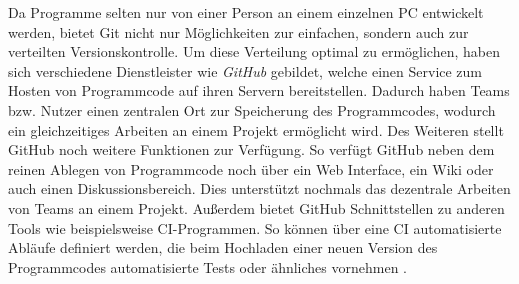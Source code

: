 Da Programme selten nur von einer Person an einem einzelnen PC entwickelt
werden, bietet Git nicht nur Möglichkeiten zur einfachen, sondern auch zur
verteilten Versionskontrolle. Um diese Verteilung optimal zu ermöglichen, haben
sich verschiedene Dienstleister wie \textit{GitHub} gebildet, welche einen
Service zum Hosten von Programmcode auf ihren Servern bereitstellen. Dadurch
haben Teams bzw. Nutzer einen zentralen Ort zur Speicherung des Programmcodes,
wodurch ein gleichzeitiges Arbeiten an einem Projekt ermöglicht wird. Des
Weiteren stellt GitHub noch weitere Funktionen zur Verfügung. So verfügt GitHub
neben dem reinen Ablegen von Programmcode noch über ein Web Interface, ein Wiki
oder auch einen Diskussionsbereich. Dies unterstützt nochmals das dezentrale
Arbeiten von Teams an einem Projekt. Außerdem bietet GitHub Schnittstellen zu
anderen Tools wie beispielsweise \ac{CI}-Programmen. So können über eine
\ac{CI} automatisierte Abläufe definiert werden, die beim Hochladen einer neuen
Version des Programmcodes automatisierte Tests oder ähnliches vornehmen
\autocite{bell_2014}.  

